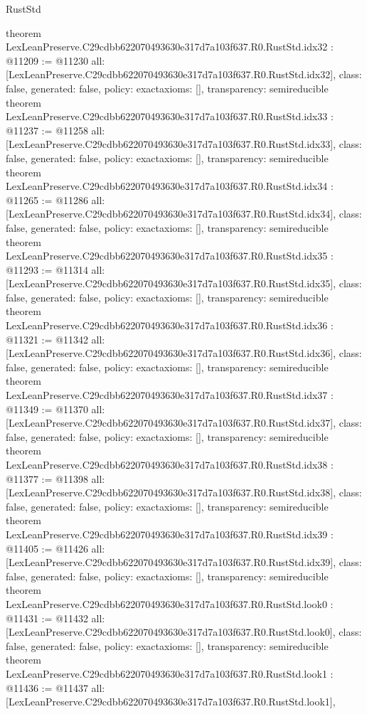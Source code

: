 \begin{lexlean}{RustStd}
\begin{coremodule}
{}
theorem LexLeanPreserve.C29cdbb622070493630e317d7a103f637.R0.RustStd.idx32 : @11209 := @11230 {
  all: [LexLeanPreserve.C29cdbb622070493630e317d7a103f637.R0.RustStd.idx32],
  class: false,
  generated: false,
  policy: exact{axioms: []},
  transparency: semireducible
}
theorem LexLeanPreserve.C29cdbb622070493630e317d7a103f637.R0.RustStd.idx33 : @11237 := @11258 {
  all: [LexLeanPreserve.C29cdbb622070493630e317d7a103f637.R0.RustStd.idx33],
  class: false,
  generated: false,
  policy: exact{axioms: []},
  transparency: semireducible
}
theorem LexLeanPreserve.C29cdbb622070493630e317d7a103f637.R0.RustStd.idx34 : @11265 := @11286 {
  all: [LexLeanPreserve.C29cdbb622070493630e317d7a103f637.R0.RustStd.idx34],
  class: false,
  generated: false,
  policy: exact{axioms: []},
  transparency: semireducible
}
theorem LexLeanPreserve.C29cdbb622070493630e317d7a103f637.R0.RustStd.idx35 : @11293 := @11314 {
  all: [LexLeanPreserve.C29cdbb622070493630e317d7a103f637.R0.RustStd.idx35],
  class: false,
  generated: false,
  policy: exact{axioms: []},
  transparency: semireducible
}
theorem LexLeanPreserve.C29cdbb622070493630e317d7a103f637.R0.RustStd.idx36 : @11321 := @11342 {
  all: [LexLeanPreserve.C29cdbb622070493630e317d7a103f637.R0.RustStd.idx36],
  class: false,
  generated: false,
  policy: exact{axioms: []},
  transparency: semireducible
}
theorem LexLeanPreserve.C29cdbb622070493630e317d7a103f637.R0.RustStd.idx37 : @11349 := @11370 {
  all: [LexLeanPreserve.C29cdbb622070493630e317d7a103f637.R0.RustStd.idx37],
  class: false,
  generated: false,
  policy: exact{axioms: []},
  transparency: semireducible
}
theorem LexLeanPreserve.C29cdbb622070493630e317d7a103f637.R0.RustStd.idx38 : @11377 := @11398 {
  all: [LexLeanPreserve.C29cdbb622070493630e317d7a103f637.R0.RustStd.idx38],
  class: false,
  generated: false,
  policy: exact{axioms: []},
  transparency: semireducible
}
theorem LexLeanPreserve.C29cdbb622070493630e317d7a103f637.R0.RustStd.idx39 : @11405 := @11426 {
  all: [LexLeanPreserve.C29cdbb622070493630e317d7a103f637.R0.RustStd.idx39],
  class: false,
  generated: false,
  policy: exact{axioms: []},
  transparency: semireducible
}
theorem LexLeanPreserve.C29cdbb622070493630e317d7a103f637.R0.RustStd.look0 : @11431 := @11432 {
  all: [LexLeanPreserve.C29cdbb622070493630e317d7a103f637.R0.RustStd.look0],
  class: false,
  generated: false,
  policy: exact{axioms: []},
  transparency: semireducible
}
theorem LexLeanPreserve.C29cdbb622070493630e317d7a103f637.R0.RustStd.look1 : @11436 := @11437 {
  all: [LexLeanPreserve.C29cdbb622070493630e317d7a103f637.R0.RustStd.look1],
}
\end{coremodule}
\end{lexlean}
